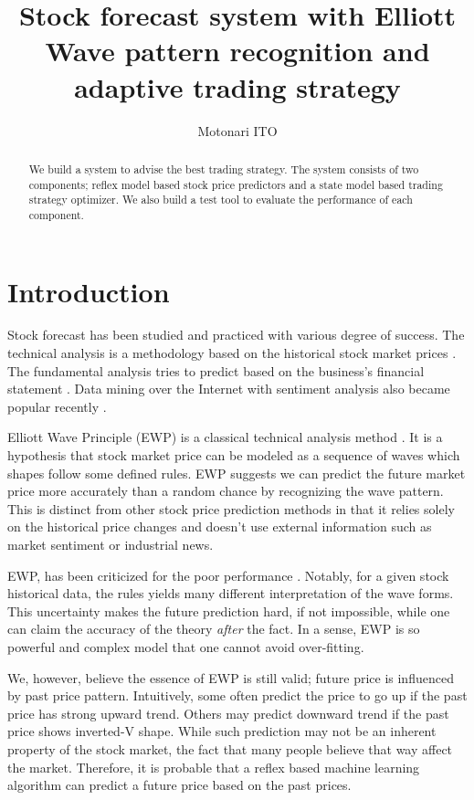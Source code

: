 \documentclass[twocolumn,10pt]{asme2ej}
\begin{document}
\title{Stock forecast system with Elliott Wave pattern recognition and adaptive trading strategy}
\author{Motonari ITO
}

\maketitle

\begin{abstract}
  We build a system to advise the best trading strategy. The system
  consists of two components; reflex model based stock price
  predictors and a state model based trading strategy optimizer. We
  also build a test tool to evaluate the performance of each
  component.
\end{abstract}

\section{Introduction}

Stock forecast has been studied and practiced with various degree of
success. The technical analysis is a methodology based on the
historical stock market prices \cite{wiki:technical_analysis}. The
fundamental analysis tries to predict based on the business's
financial statement \cite{wiki:fundamental_analysis}. Data mining over
the Internet with sentiment analysis also became popular recently
\cite{web:data_mining_analysis}.

Elliott Wave Principle (EWP) is a classical technical analysis method
\cite{frost1981elliott, web:study_of_cycles}. It is a hypothesis that stock market price
can be modeled as a sequence of waves which shapes follow some defined
rules. EWP suggests we can predict the future market price more
accurately than a random chance by recognizing the wave pattern.  This
is distinct from other stock price prediction methods in that it
relies solely on the historical price changes and doesn't use external
information such as market sentiment or industrial news. 

EWP, has been criticized for the poor performance
\cite{aronson2007evidence-based}. Notably, for a given stock
historical data, the rules yields many different interpretation of the
wave forms. This uncertainty makes the future prediction hard, if not
impossible, while one can claim the accuracy of the theory
\emph{after} the fact. In a sense, EWP is so powerful and complex
model that one cannot avoid over-fitting.

We, however, believe the essence of EWP is still valid; future price
is influenced by past price pattern. Intuitively, some often predict
the price to go up if the past price has strong upward trend. Others
may predict downward trend if the past price shows inverted-V
shape. While such prediction may not be an inherent property of the
stock market, the fact that many people believe that way affect the
market. Therefore, it is probable that a reflex based machine learning
algorithm can predict a future price based on the past prices.
\end{document}
